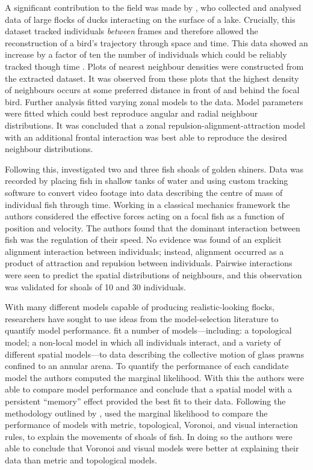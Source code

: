 A significant contribution to the field was made by \textcite{lukeman10}, who
collected and analysed data of large flocks of ducks interacting on the surface
of a lake. Crucially, this dataset tracked individuals \emph{between} frames
and therefore allowed the reconstruction of a bird's trajectory through space
and time. This data showed an increase by a factor of ten the number of
individuals which could be reliably tracked though time \parencite{lukeman09}.
Plots of nearest neighbour densities were constructed from the extracted
dataset. It was observed from these plots that the highest density of
neighbours occurs at some preferred distance in front of and behind the focal
bird. Further analysis fitted varying zonal models to the data. Model
parameters were fitted which could best reproduce angular and radial neighbour
distributions. It was concluded that a zonal repulsion-alignment-attraction
model with an additional frontal interaction was best able to reproduce the
desired neighbour distributions.

Following this, \cite{katz11} investigated two and three fish shoals of golden
shiners. Data was recorded by placing fish in shallow tanks of water and using
custom tracking software to convert video footage into data describing the
centre of mass of individual fish through time. Working in a classical
mechanics framework the authors considered the effective forces acting on a
focal fish as a function of position and velocity. The authors found that the
dominant interaction between fish was the regulation of their speed. No
evidence was found of an explicit alignment interaction between individuals;
instead, alignment occurred as a product of attraction and repulsion between
individuals. Pairwise interactions were seen to predict the spatial
distributions of neighbours, and this observation was validated for shoals of
10 and 30 individuals.

With many different models capable of producing realistic-looking flocks,
researchers have sought to use ideas from the model-selection literature to
quantify model performance. \textcite{mann13} fit a number of
models---including: a topological model; a non-local model in which all
individuals interact, and a variety of different spatial models---to data
describing the collective motion of glass prawns confined to an annular arena.
To quantify the performance of each candidate model the authors computed the
marginal likelihood. With this the authors were able to compare model
performance and conclude that a spatial model with a persistent ``memory''
effect provided the best fit to their data. Following the methodology outlined
by \textcite{mann13}, \textcite{strandburg13} used the marginal likelihood to
compare the performance of models with metric, topological, Voronoi, and visual
interaction rules, to explain the movements of shoals of fish. In doing so the
authors were able to conclude that Voronoi and visual models were better at
explaining their data than metric and topological models.

